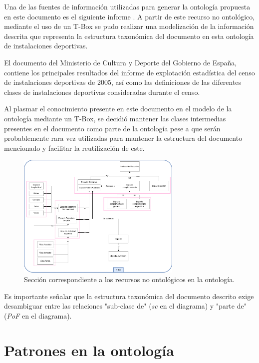 \documentclass[a4paper,12pt]{article}
\begin{document}
	Una de las fuentes de información utilizadas para generar la ontología propuesta en este documento es el siguiente informe \cite{pdf-culturaydeporte}. A partir de este recurso no ontológico, mediante el uso de un T-Box se pudo realizar una modelización de la información descrita que representa la estructura taxonómica del documento en esta ontología de instalaciones deportivas. 
	
	El documento \cite{pdf-culturaydeporte} del Ministerio de Cultura y Deporte del Gobierno de España, contiene los  principales resultados del informe de explotación estadística del censo de instalaciones deportivas de 2005, así como las definiciones de las diferentes clases de instalaciones deportivas consideradas durante el censo.
	
	Al plasmar el conocimiento presente en este documento en el modelo de la ontología mediante un T-Box, se decidió mantener las clases intermedias presentes en el documento como parte de la ontología pese a que serán probablemente rara vez utilizadas para mantener la estructura del documento mencionado y facilitar la reutilización de este. 
	
	\begin{figure}[H]
		\centering
		\includegraphics[width=0.7\textwidth]{include/tbox.png}
		\caption{Sección correspondiente a los recursos no ontológicos en la ontología.}
	\end{figure}
	
	Es importante señalar que la estructura taxonómica del documento descrito exige desambiguar entre las relaciones "sub-clase de" (\textit{sc} en el diagrama) y "parte de" (\textit{PoF} en el diagrama).
	
	\section{Patrones en la ontología}
	
\end{document}
